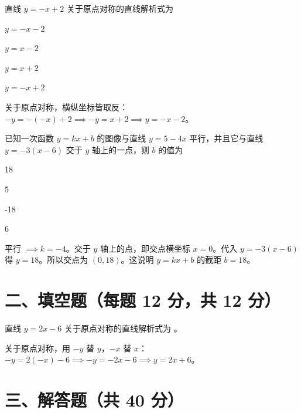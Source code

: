 \documentclass{exam-zh}
\begin{document}
\begin{question}[points=12]
  直线 $y = -x + 2$ 关于原点对称的直线解析式为
  \begin{choices}
    \item $y = -x - 2$
    \item $y = x - 2$
    \item $y = x + 2$
    \item $y = -x + 2$
  \end{choices}
  \paren[A]
  \begin{solutionblock}
    关于原点对称，横纵坐标皆取反：$-y = -(-x) + 2 \implies -y = x + 2 \implies y = -x - 2$。
  \end{solutionblock}
\end{question}



\begin{question}[points=12]
  已知一次函数 $y = kx + b$ 的图像与直线 $y = 5 - 4x$ 平行，并且它与直线 $y = -3(x - 6)$ 交于 $y$ 轴上的一点，则 $b$ 的值为
  \begin{choices}
    \item 18
    \item 5
    \item -18
    \item 6
  \end{choices}
  \paren[A]
  \begin{solutionblock}
    平行 $\implies k = -4$。交于 $y$ 轴上的点，即交点横坐标 $x = 0$。代入 $y = -3(x-6)$ 得 $y = 18$。所以交点为 $(0, 18)$。这说明 $y=kx+b$ 的截距 $b = 18$。
  \end{solutionblock}
\end{question}


\section*{二、填空题（每题 12 分，共 12 分）}


\begin{question}[points=12]
  直线 $y = 2x - 6$ 关于原点对称的直线解析式为 \fillin。
  \paren[$y = 2x + 6$]
  \begin{solutionblock}
    关于原点对称，用 $-y$ 替 $y$，$-x$ 替 $x$：$-y = 2(-x) - 6 \implies -y = -2x - 6 \implies y = 2x + 6$。
  \end{solutionblock}
\end{question}


\section*{三、解答题（共 40 分）}
\end{document}
